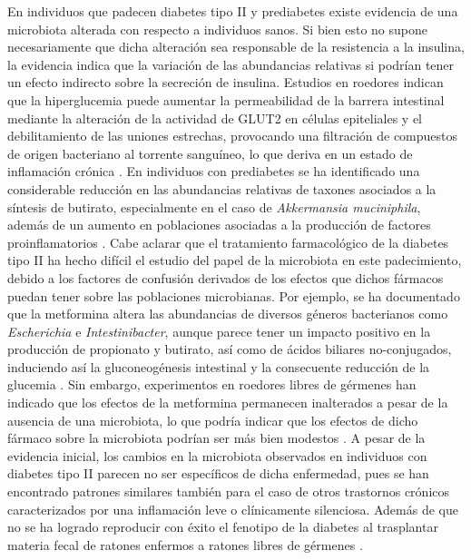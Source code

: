 \documentclass[
]{book}
\begin{document}
En individuos que padecen diabetes tipo II y prediabetes existe evidencia de una microbiota alterada con respecto a individuos sanos. Si bien esto no supone necesariamente que dicha alteración sea responsable de la resistencia a la insulina, la evidencia indica que la variación de las abundancias relativas si podrían tener un efecto indirecto sobre la secreción de insulina. Estudios en roedores indican que la hiperglucemia puede aumentar la permeabilidad de la barrera intestinal mediante la alteración de la actividad de GLUT2 en células epiteliales y el debilitamiento de las uniones estrechas, provocando una filtración de compuestos de origen bacteriano al torrente sanguíneo, lo que deriva en un estado de inflamación crónica \citep{thaiss2018hyperglycemia}. En individuos con prediabetes se ha identificado una considerable reducción en las abundancias relativas de taxones asociados a la síntesis de butirato, especialmente en el caso de \emph{Akkermansia muciniphila}, además de un aumento en poblaciones asociadas a la producción de factores proinflamatorios \citep{allin2018aberrant}. Cabe aclarar que el tratamiento farmacológico de la diabetes tipo II ha hecho difícil el estudio del papel de la microbiota en este padecimiento, debido a los factores de confusión derivados de los efectos que dichos fármacos puedan tener sobre las poblaciones microbianas. Por ejemplo, se ha documentado que la metformina altera las abundancias de diversos géneros bacterianos como \emph{Escherichia} e \emph{Intestinibacter}, aunque parece tener un impacto positivo en la producción de propionato y butirato, así como de ácidos biliares no-conjugados, induciendo así la gluconeogénesis intestinal y la consecuente reducción de la glucemia \citep{bryrup2019metformin}. Sin embargo, experimentos en roedores libres de gérmenes han indicado que los efectos de la metformina permanecen inalterados a pesar de la ausencia de una microbiota, lo que podría indicar que los efectos de dicho fármaco sobre la microbiota podrían ser más bien modestos \citep{adeshirlarijaney2019amelioration}. A pesar de la evidencia inicial, los cambios en la microbiota observados en individuos con diabetes tipo II parecen no ser específicos de dicha enfermedad, pues se han encontrado patrones similares también para el caso de otros trastornos crónicos caracterizados por una inflamación leve o clínicamente silenciosa. Además de que no se ha logrado reproducir con éxito el fenotipo de la diabetes al trasplantar materia fecal de ratones enfermos a ratones libres de gérmenes \citep{allin2018aberrant}.
\end{document}
